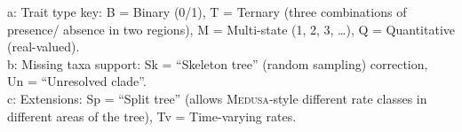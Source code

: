 \documentclass[12pt]{article}
\begin{document}
\begin{table}
  \vspace{12pt}

  \raggedright
  a: Trait type key: B = Binary (0/1),
  T = Ternary (three combinations of presence/ absence in two regions),
  M = Multi-state (1, 2, 3, \ldots),
  Q = Quantitative (real-valued).\\
  b: Missing taxa support: Sk = ``Skeleton tree'' (random sampling)
  correction, \\Un = ``Unresolved clade''.\\
  c: Extensions: Sp = ``Split tree'' (allows \textsc{Medusa}-style
  different rate classes in different areas of the tree), Tv =
  Time-varying rates.
\end{table}

\end{document}
